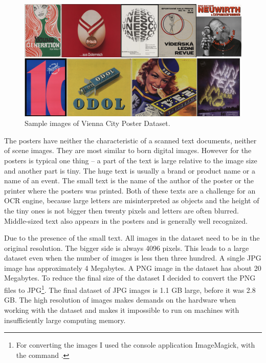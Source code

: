 \begin{figure}[hbtp]
    \centering
    \includegraphics[scale=0.5]{obrazky/Dataset_vienna.png}
    \caption{Sample images of Vienna City Poster Dataset.}
    \label{Im:Dvienna}
\end{figure}


The posters have neither the characteristic of a scanned text documents, neither of scene images. They are most similar to born digital images. However for the posters is typical one thing -- a part of the text is large relative to the image size and another part is tiny. The huge text is usually a brand or product name or a name of an event. The small text is the name of the author of the poster or the printer where the posters was printed. Both of these texts are a challenge for an OCR engine, because large letters are misinterpreted as objects and the height of the tiny ones is not bigger then twenty pixels and letters are often blurred. Middle-sized text also appears in the posters and is generally well recognized.

Due to the presence of the small text. All images in the dataset need  to be in the original resolution. The bigger side is always 4096 pixels. This leads to a large dataset even when the number of images is less then three hundred. A single JPG image has approximately 4 Megabytes. A PNG image in the dataset has about 20 Megabytes. To reduce the final size of the dataset I decided to convert the PNG files to JPG\footnote{For converting the images I used the console application ImageMagick, with the command \newline {}.}. The final dataset of JPG images is 1.1 GB large, before it was 2.8 GB. The high resolution of images makes demands on the hardware when working with the dataset and makes it impossible to run on machines with insufficiently large computing memory.


